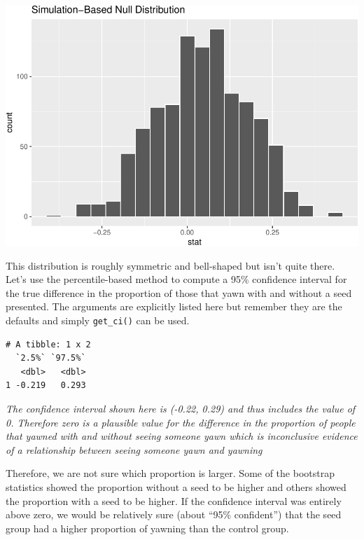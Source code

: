 \documentclass[]{article}
\newenvironment{Shaded}{\begin{snugshade}}{\end{snugshade}}
\newcommand{\KeywordTok}[1]{\textcolor[rgb]{0.13,0.29,0.53}{\textbf{#1}}}
\newcommand{\DataTypeTok}[1]{\textcolor[rgb]{0.13,0.29,0.53}{#1}}
\newcommand{\FloatTok}[1]{\textcolor[rgb]{0.00,0.00,0.81}{#1}}
\newcommand{\StringTok}[1]{\textcolor[rgb]{0.31,0.60,0.02}{#1}}
\newcommand{\OperatorTok}[1]{\textcolor[rgb]{0.81,0.36,0.00}{\textbf{#1}}}
\newcommand{\NormalTok}[1]{#1}
\begin{document}
\includegraphics{DAWeek7_files/figure-latex/yawn_generate-1.pdf}

This distribution is roughly symmetric and bell-shaped but isn't quite
there. Let's use the percentile-based method to compute a 95\%
confidence interval for the true difference in the proportion of those
that yawn with and without a seed presented. The arguments are
explicitly listed here but remember they are the defaults and simply
\texttt{get\_ci()} can be used.

\begin{Shaded}
\end{Shaded}

\begin{verbatim}
# A tibble: 1 x 2
  `2.5%` `97.5%`
   <dbl>   <dbl>
1 -0.219   0.293
\end{verbatim}

\emph{The confidence interval shown here is (-0.22, 0.29) and thus
includes the value of 0. Therefore zero is a plausible value for the
difference in the proportion of people that yawned with and without
seeing someone yawn which is inconclusive evidence of a relationship
between seeing someone yawn and yawning}

Therefore, we are not sure which proportion is larger. Some of the
bootstrap statistics showed the proportion without a seed to be higher
and others showed the proportion with a seed to be higher. If the
confidence interval was entirely above zero, we would be relatively sure
(about ``95\% confident'') that the seed group had a higher proportion
of yawning than the control group.
\end{document}
